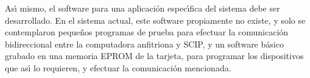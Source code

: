 As\'{\i} mismo, el software para una aplicaci\'on espec\'{\i}fica del sistema debe ser %
desarrollado. En el sistema actual, este software propiamente no existe, y solo se contemplaron %
peque\~nos programas de prueba para efectuar la comunicaci\'on bidireccional entre la %
computadora anfitriona y SCIP, y un software b\'asico grabado en una memoria EPROM de la tarjeta, %
para programar los dispositivos que as\'{\i} lo requieren, y efectuar la comunicaci\'on %
mencionada.

